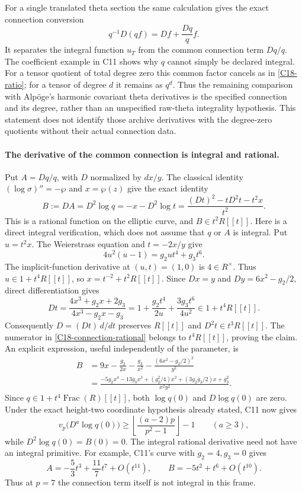 \documentclass[11pt]{article}
\theoremstyle{definition}\newtheorem{definition}[theorem]{Definition}\newtheorem{remark}[theorem]{Remark}
\begin{document}
For a single translated theta section the same calculation gives
the exact connection conversion
\[
 q^{-1}D(qf)=Df+\frac{Dq}{q}f.
\]
It separates the integral function $u_T$ from the common connection
term $Dq/q$. The coefficient example in C11 shows why $q$ cannot
simply be declared integral. For a tensor quotient of total degree
zero this common factor cancels as in \eqref{C18-ratio}; for a
tensor of degree $d$ it remains as $q^d$. Thus the remaining
comparison with Alp\"oge's harmonic covariant theta derivatives
is the specified connection and its degree, rather than an
unspecified raw-theta integrality hypothesis. This statement does
not identify those archive derivatives with the degree-zero
quotients without their actual connection data.

\paragraph{The derivative of the common connection is integral and rational.}
Put $A=Dq/q$, with $D$ normalized by $dx/y$.  The classical identity
$(\log\sigma)''=-\wp$ and $x=\wp(z)$ give the exact identity
\begin{equation}\label{C18-connection-rational}
 B:=DA=D^2\log q=-x-D^2\log t
   =\frac{(Dt)^2-tD^2t-t^2x}{t^2}.
\end{equation}
This is a rational function on the elliptic curve, and
$B\in t^2R[[t]]$.  Here is a direct integral verification, which does
not assume that $q$ or $A$ is integral.  Put $u=t^2x$.  The Weierstrass
equation and $t=-2x/y$ give
\[
 4u^2(u-1)=g_2u t^4+g_3t^6.
\]
The implicit-function derivative at $(u,t)=(1,0)$ is $4\in R^\times$.
Thus $u\in1+t^4R[[t]]$, so $x=t^{-2}+t^2R[[t]]$.
Since $Dx=y$ and $Dy=6x^2-g_2/2$, direct differentiation gives
\[
 Dt=\frac{4x^3+g_2x+2g_3}{4x^3-g_2x-g_3}
    =1+\frac{g_2t^4}{2u}+\frac{3g_3t^6}{4u^2}
       \in1+t^4R[[t]].
\]
Consequently $D=(Dt)\,d/dt$ preserves $R[[t]]$ and
$D^2t\in t^3R[[t]]$.  The numerator in
\eqref{C18-connection-rational} belongs to $t^4R[[t]]$, proving the
claim.  An explicit expression, useful independently of the parameter,
is
\begin{align*}
 B&=9x-\frac{g_2}{2x}-\frac{g_3}{x^2}
       -\frac{(6x^2-g_2/2)^2}{y^2}\\
  &=\frac{-5g_2x^4-13g_3x^3+(g_2^2/4)x^2
                +(3g_2g_3/2)x+g_3^2}{x^2y^2}.
\end{align*}
Since $q\in1+t^4\operatorname{Frac}(R)[[t]]$, both
$\log q(0)$ and $D\log q(0)$ are zero.  Under the exact height-two
coordinate hypothesis already stated, C11 now gives
\[
 v_p\bigl(D^a\log q(0)\bigr)
   \geq\left\lfloor\frac{(a-2)p}{p^2-1}\right\rfloor-1
       \qquad(a\geq3),
\]
while $D^2\log q(0)=B(0)=0$.
The integral rational derivative need not have an integral primitive.
For example, C11's curve with $g_2=4,g_3=0$ gives
\[
 A=-\frac53t^3+\frac{11}{7}t^7+O(t^{11}),\qquad
 B=-5t^2+t^6+O(t^{10}).
\]
Thus at $p=7$ the connection term itself is not integral in this frame.
\end{document}
